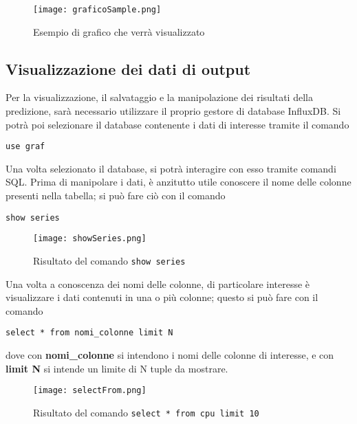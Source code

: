 \documentclass[../manuale-utente.tex]{subfiles}
\begin{document}
\begin{figure}[h!]
    \begin{center}
      \texttt{[image: graficoSample.png]}\\
      \caption{Esempio di grafico che verrà visualizzato}%
      \label{fig:esempio-grafico}
    \end{center}
  \end{figure}

\subsection{Visualizzazione dei dati di output}
Per la visualizzazione, il salvataggio e la manipolazione dei risultati della predizione, sarà necessario utilizzare il proprio gestore di database InfluxDB. Si potrà poi selezionare il database contenente i dati di interesse tramite il comando
\\ \centerline{\texttt{use graf}}
Una volta selezionato il database, si potrà interagire con esso tramite comandi SQL. Prima di manipolare i dati, è anzitutto utile conoscere il nome delle colonne presenti nella tabella; si può fare ciò con il comando
\\ \centerline{\texttt{show series}}

\begin{figure}[H]
  \begin{center}
    \texttt{[image: showSeries.png]}\\
    \caption{Risultato del comando \texttt{show series}}%
    \label{fig:show-series}
  \end{center}
\end{figure}

Una volta a conoscenza dei nomi delle colonne, di particolare interesse è visualizzare i dati contenuti in una o più colonne; questo si può fare con il comando
\\ \centerline{\texttt{select * from nomi\_colonne limit N}}

dove con \textbf{nomi\_colonne} si intendono i nomi delle colonne di interesse, e con \textbf{limit N} si intende un limite di N tuple da mostrare.

\begin{figure}[H]
  \begin{center}
    \texttt{[image: selectFrom.png]}\\
    \caption{Risultato del comando \texttt{select * from cpu limit 10}}%
    \label{fig:show-series}
  \end{center}
\end{figure}
\end{document}
